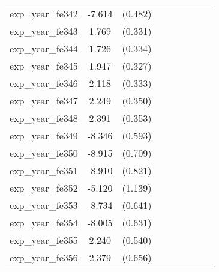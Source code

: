 {\begin{tabular}{l*{4}{cc}}
exp\_year\_fe342&   -7.614\sym{***}&  (0.482)&                  &         &                  &         &                  &         \\
exp\_year\_fe343&    1.769\sym{***}&  (0.331)&                  &         &                  &         &                  &         \\
exp\_year\_fe344&    1.726\sym{***}&  (0.334)&                  &         &                  &         &                  &         \\
exp\_year\_fe345&    1.947\sym{***}&  (0.327)&                  &         &                  &         &                  &         \\
exp\_year\_fe346&    2.118\sym{***}&  (0.333)&                  &         &                  &         &                  &         \\
exp\_year\_fe347&    2.249\sym{***}&  (0.350)&                  &         &                  &         &                  &         \\
exp\_year\_fe348&    2.391\sym{***}&  (0.353)&                  &         &                  &         &                  &         \\
exp\_year\_fe349&   -8.346\sym{***}&  (0.593)&                  &         &                  &         &                  &         \\
exp\_year\_fe350&   -8.915\sym{***}&  (0.709)&                  &         &                  &         &                  &         \\
exp\_year\_fe351&   -8.910\sym{***}&  (0.821)&                  &         &                  &         &                  &         \\
exp\_year\_fe352&   -5.120\sym{***}&  (1.139)&                  &         &                  &         &                  &         \\
exp\_year\_fe353&   -8.734\sym{***}&  (0.641)&                  &         &                  &         &                  &         \\
exp\_year\_fe354&   -8.005\sym{***}&  (0.631)&                  &         &                  &         &                  &         \\
exp\_year\_fe355&    2.240\sym{***}&  (0.540)&                  &         &                  &         &                  &         \\
exp\_year\_fe356&    2.379\sym{***}&  (0.656)&                  &         &                  &         &                  &         \\

\end{tabular}}
